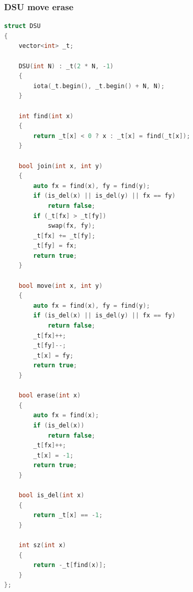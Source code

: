 \documentclass[10pt,landscape,a4paper,twocolumn]{article}
\begin{document}
\subsubsection{DSU move erase}
\begin{lstlisting}[language=C++]
struct DSU
{
    vector<int> _t;

    DSU(int N) : _t(2 * N, -1)
    {
        iota(_t.begin(), _t.begin() + N, N);
    }

    int find(int x)
    {
        return _t[x] < 0 ? x : _t[x] = find(_t[x]);
    }

    bool join(int x, int y)
    {
        auto fx = find(x), fy = find(y);
        if (is_del(x) || is_del(y) || fx == fy)
            return false;
        if (_t[fx] > _t[fy])
            swap(fx, fy);
        _t[fx] += _t[fy];
        _t[fy] = fx;
        return true;
    }

    bool move(int x, int y)
    {
        auto fx = find(x), fy = find(y);
        if (is_del(x) || is_del(y) || fx == fy)
            return false;
        _t[fx]++;
        _t[fy]--;
        _t[x] = fy;
        return true;
    }

    bool erase(int x)
    {
        auto fx = find(x);
        if (is_del(x))
            return false;
        _t[fx]++;
        _t[x] = -1;
        return true;
    }

    bool is_del(int x)
    {
        return _t[x] == -1;
    }

    int sz(int x)
    {
        return -_t[find(x)];
    }
};

\end{lstlisting}
\end{document}
